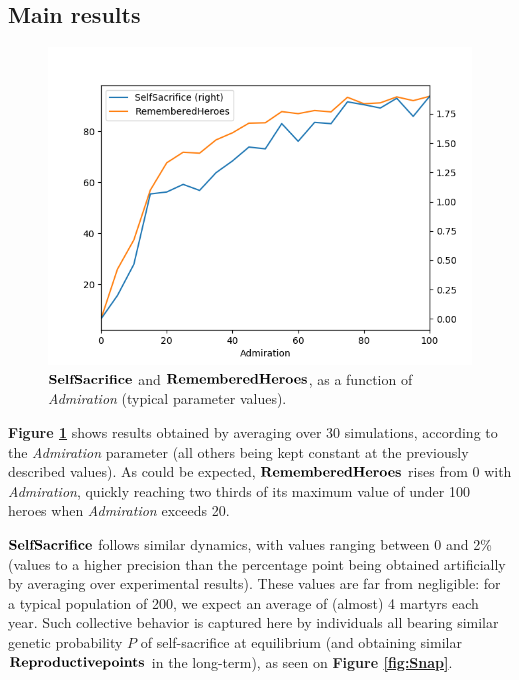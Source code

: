 \documentclass[a4paper,12pt]{report}
\begin{document}
\subsection{Main results}

\begin{figure}[h]
\centering
\includegraphics[width=1\textwidth]{RGT_10}
\caption{$\bf{SelfSacrifice}$ and $\bf{RememberedHeroes}$, as a function of \emph{Admiration} (typical parameter values).}
\label{fig:RGT_10}
\end{figure}



\textbf{Figure \ref{fig:RGT_10}} shows results obtained by averaging over 30 simulations, according to the \emph{Admiration}
 parameter (all others being kept constant at the previously described values). As could be expected, $\bf{RememberedHeroes}$
 rises from 0 with \emph{Admiration}, quickly reaching two thirds of its maximum value of under 100 heroes when
 \emph{Admiration} exceeds 20. 
 
 $\bf{SelfSacrifice}$ follows similar dynamics, with values ranging between 0 and 2\% (values to a higher precision than
 the percentage point being obtained artificially by averaging over experimental results). These values are far from negligible:
 for a typical population of 200, we expect an average of (almost) 4 martyrs each year.
 Such collective behavior is captured here by individuals all bearing similar genetic probability $P$
 of self-sacrifice at equilibrium (and obtaining similar $\bf{Reproductive points}$ in the 
 long-term), as seen on \textbf{Figure \ref{fig:Snap}}. 
 
\end{document}
